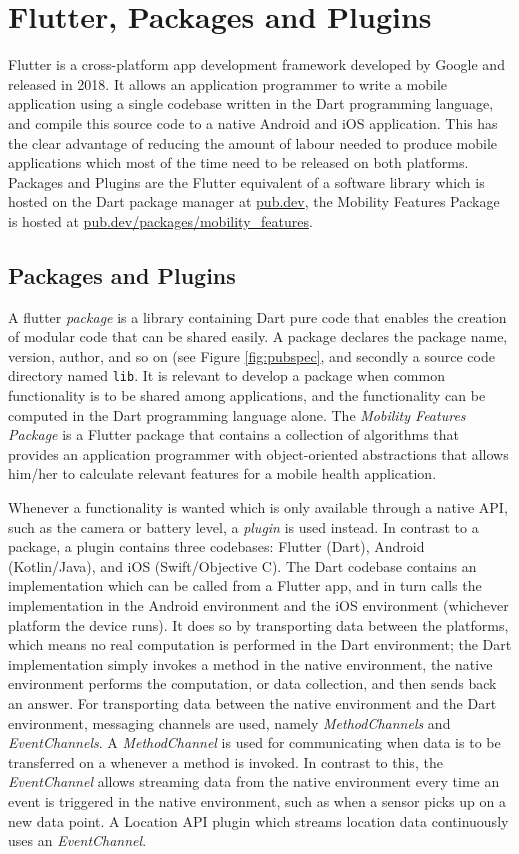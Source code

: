 \section{Flutter, Packages and Plugins}
Flutter is a cross-platform app development framework developed by Google and released in 2018. It allows an application programmer to write a mobile application using a single codebase written in the Dart programming language, and compile this source code to a native Android and iOS application. This has the clear advantage of reducing the amount of labour needed to produce mobile applications which most of the time need to be released on both platforms. Packages and Plugins are the Flutter equivalent of a software library which is hosted on the Dart package manager at \url{pub.dev}, the Mobility Features Package is hosted at \url{pub.dev/packages/mobility_features}. 

\subsection{Packages and Plugins}
A flutter \textit{package} is a library containing Dart pure code that enables the creation of modular code that can be shared easily. A package declares the package name, version, author, and so on (see Figure \ref{fig:pubspec}, and secondly a source code directory named \verb|lib|. It is relevant to develop a package when common functionality is to be shared among applications, and the functionality can be computed in the Dart programming language alone. The \textit{Mobility Features Package} is a Flutter package that contains a collection of algorithms that provides an application programmer with object-oriented abstractions that allows him/her to calculate relevant features for a mobile health application. 

Whenever a functionality is wanted which is only available through a native API, such as the camera or battery level, a \textit{plugin} is used instead. In contrast to a package, a plugin contains three codebases: Flutter (Dart), Android (Kotlin/Java), and iOS (Swift/Objective C). The Dart codebase contains an implementation which can be called from a Flutter app, and in turn calls the implementation in the Android environment and the iOS environment (whichever platform the device runs). It does so by transporting data between the platforms, which means no real computation is performed in the Dart environment; the Dart implementation simply invokes a method in the native environment, the native environment performs the computation, or data collection, and then sends back an answer. For transporting data between the native environment and the Dart environment, messaging channels are used, namely \textit{MethodChannels} and \textit{EventChannels}. A \textit{MethodChannel} is used for communicating when data is to be transferred on a whenever a method is invoked. In contrast to this, the \textit{EventChannel} allows streaming data from the native environment every time an event is triggered in the native environment, such as when a sensor picks up on a new data point. A Location API plugin which streams location data continuously uses an \textit{EventChannel}.

